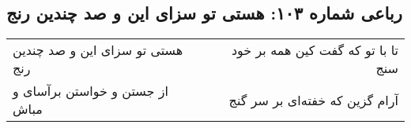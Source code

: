 \begin{center}
\section*{رباعی شماره ۱۰۳: هستی تو سزای این و صد چندین رنج}
\label{sec:sh103}
\begin{longtable}{l p{0.5cm} r}
هستی تو سزای این و صد چندین رنج
&&
تا با تو که گفت کین همه بر خود سنج
\\
از جستن و خواستن برآسای و مباش
&&
آرام گزین که خفته‌ای بر سر گنج
\\
\end{longtable}
\end{center}
